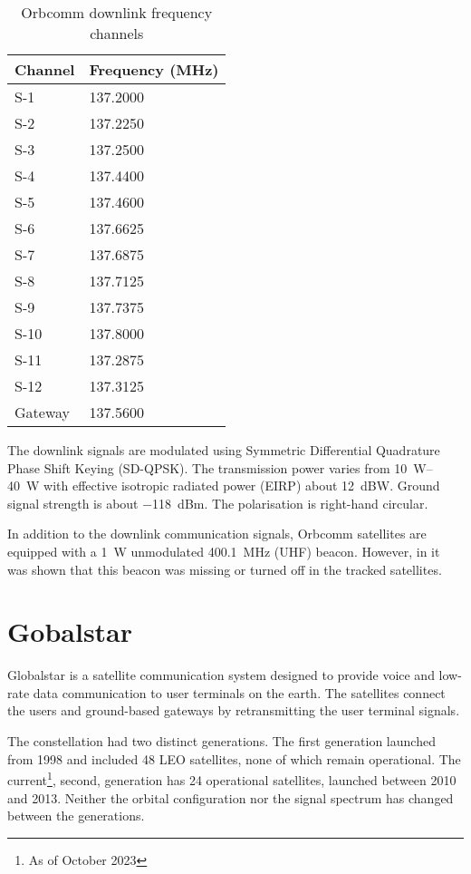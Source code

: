 \begin{table}
\caption{Orbcomm downlink frequency channels\cite{sat13}}
\label{t_sat_orbcomm_channels}
\begin{tabular}{ll}
Channel & Frequency (MHz) \\ \hline
S-1     & 137.2000        \\
S-2     & 137.2250        \\
S-3     & 137.2500        \\
S-4     & 137.4400        \\
S-5     & 137.4600        \\
S-6     & 137.6625        \\
S-7     & 137.6875        \\
S-8     & 137.7125        \\
S-9     & 137.7375        \\
S-10    & 137.8000        \\
S-11    & 137.2875        \\
S-12    & 137.3125        \\
Gateway & 137.5600       
\end{tabular}
\end{table}

The downlink signals are modulated using Symmetric Differential Quadrature Phase Shift Keying (SD-QPSK). The transmission power varies from \qtyrange{10}{40}{W} with effective isotropic radiated power (EIRP) about \qty{12}{dBW}. Ground signal strength is about \qty{-118}{dBm}. The polarisation is right-hand circular\cite{sop08, sat11}.

In addition to the downlink communication signals, Orbcomm satellites are equipped with a \qty{1}{W} unmodulated \qty{400.1}{MHz} (UHF) beacon\cite{sat13}. However, in \cite{sop08} it was shown that this beacon was missing or turned off in the tracked satellites.

\section{Gobalstar}
Globalstar is a satellite communication system designed to provide voice and low-rate data communication to user terminals on the earth. The satellites connect the users and ground-based gateways by retransmitting the user terminal signals\cite{sop07, sat14}.

The constellation had two distinct generations. The first generation launched from 1998 and included 48 LEO satellites, none of which remain operational. The current\footnote{As of October 2023}, second, generation has 24 operational satellites, launched between 2010 and 2013. Neither the orbital configuration nor the signal spectrum has changed between the generations\cite{sat15}.



